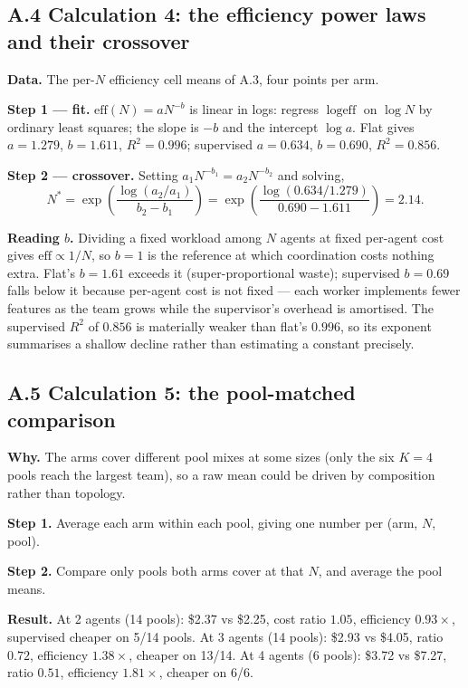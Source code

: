 \documentclass[11pt,a4paper]{article}
\begin{document}
\subsection*{A.4 \quad Calculation 4: the efficiency power laws and their crossover}

\textbf{Data.} The per-$N$ efficiency cell means of A.3, four points per arm.

\textbf{Step 1 --- fit.} $\text{eff}(N) = a N^{-b}$ is linear in logs: regress $\log \text{eff}$ on $\log N$ by ordinary least squares; the slope is $-b$ and the intercept $\log a$. Flat gives $a = 1.279$, $b = 1.611$, $R^2 = 0.996$; supervised $a = 0.634$, $b = 0.690$, $R^2 = 0.856$.

\textbf{Step 2 --- crossover.} Setting $a_1 N^{-b_1} = a_2 N^{-b_2}$ and solving,
\[
N^{*} = \exp\!\left(\frac{\log(a_2/a_1)}{b_2 - b_1}\right) = \exp\!\left(\frac{\log(0.634/1.279)}{0.690 - 1.611}\right) = 2.14 .
\]

\textbf{Reading $b$.} Dividing a fixed workload among $N$ agents at fixed per-agent cost gives $\text{eff} \propto 1/N$, so $b = 1$ is the reference at which coordination costs nothing extra. Flat's $b = 1.61$ exceeds it (super-proportional waste); supervised $b = 0.69$ falls below it because per-agent cost is not fixed --- each worker implements fewer features as the team grows while the supervisor's overhead is amortised. The supervised $R^2$ of $0.856$ is materially weaker than flat's $0.996$, so its exponent summarises a shallow decline rather than estimating a constant precisely.

\subsection*{A.5 \quad Calculation 5: the pool-matched comparison}

\textbf{Why.} The arms cover different pool mixes at some sizes (only the six $K=4$ pools reach the largest team), so a raw mean could be driven by composition rather than topology.

\textbf{Step 1.} Average each arm within each pool, giving one number per (arm, $N$, pool).

\textbf{Step 2.} Compare only pools both arms cover at that $N$, and average the pool means.

\textbf{Result.} At 2 agents (14 pools): \$2.37 vs \$2.25, cost ratio $1.05$, efficiency $0.93\times$, supervised cheaper on 5/14 pools. At 3 agents (14 pools): \$2.93 vs \$4.05, ratio $0.72$, efficiency $1.38\times$, cheaper on 13/14. At 4 agents (6 pools): \$3.72 vs \$7.27, ratio $0.51$, efficiency $1.81\times$, cheaper on 6/6.
\end{document}
